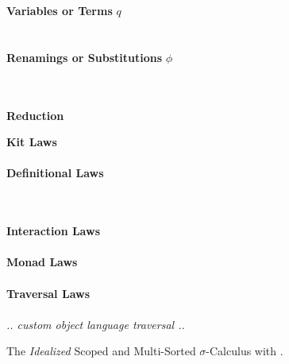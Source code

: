 \documentclass[screen,nonacm]{acmart}
\begin{document}
\begin{figure}[t]
\begin{minipage}[t]{0.48\textwidth}
            \textbf{Variables or Terms} $q$\\
            \EVarTrmTy{}\\
            \vspace{0.5em}
            \EVarTrmApp{}\\
            \vspace{0.5em}
            \textbf{Renamings or Substitutions} $ϕ$\\
            \EPrimsTy{}\\
            \vspace{0.5em}
            \EPrims{}\\
            \vspace{0.5em}
      \end{minipage}

      {\raggedright \vspace{2.0em} \textbf{\Large Reduction} \par}
      \vspace{1.5em}
      \begin{minipage}[t]{0.48\textwidth}
            \raggedright
            \textbf{Kit Laws}\\
            \ETypeLevel{}\\
            \vspace{0.5em}
            \textbf{Definitional Laws}\\
            \vspace{0.5em}
            \EDefLawTy{}\\
            \vspace{0.5em}
            \EDefLaw{}\\

      \end{minipage}
      \hfill
      \begin{minipage}[t]{0.48\textwidth}
            \raggedright
            \textbf{Interaction Laws}\\
            \EInteraction{}\\
            \vspace{0.5em}
            \textbf{Monad Laws}\\
            \EMonad{}\\
            \vspace{0.5em}
            \textbf{Traversal Laws}\\
            \ETravL{}\\
            \emph{.. custom object language traversal ..}
      \end{minipage}
      \caption{The \emph{Idealized} Scoped and Multi-Sorted $\sigma$-Calculus with .}
      \label{fig:ags:fin}
\end{figure}
\end{document}
